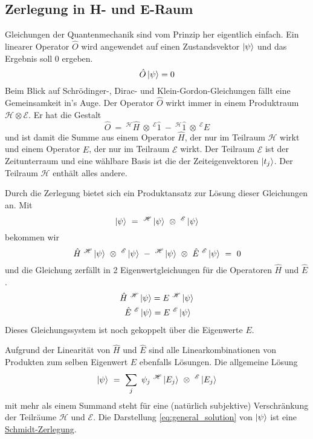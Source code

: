 \documentclass[12pt]{article}
\begin{document}
\subsection{Zerlegung in H- und E-Raum}
Gleichungen der Quantenmechanik sind vom Prinzip her eigentlich einfach. Ein linearer Operator $\hat{O}$ wird angewendet auf einen Zustandsvektor $\ket{\psi}$ und das Ergebnis soll $0$ ergeben.
\begin{equation*} 
\hat{O}\ket{\psi} = 0 
\end{equation*}
Beim Blick auf Schrödinger-, Dirac- und Klein-Gordon-Gleichungen fällt eine Gemeinsamkeit in's Auge. Der Operator $\hat{O}$ wirkt immer in einem Produktraum $\mathscr{H} \otimes \mathscr{E}$. Er hat die Gestalt 
\begin{equation*} 
\hat{O}\ =\ ^\mathscr{H}\hat{H}\ \otimes\ ^\mathscr{E}\hat{1}\ -\ ^\mathscr{H}\hat{1}\ \otimes\ ^\mathscr{E}\hat{E}
\end{equation*}
und ist damit die Summe aus einem Operator $\hat{H}$, der nur im Teilraum $\mathscr{H}$ wirkt und einem Operator $\hat{E}$, der nur im Teilraum $\mathscr{E}$ wirkt. Der Teilraum $\mathscr{E}$ ist der Zeitunterraum und eine wählbare Basis ist die der Zeiteigenvektoren $\ket{t_j}$. Der Teilraum $\mathscr{H}$ enthält alles andere.

Durch die Zerlegung bietet sich ein Produktansatz zur Lösung dieser Gleichungen an. Mit
\begin{equation*} 
\ket{\psi}\ =\ ^\mathscr{H}\ket{\psi}\ \otimes\ ^\mathscr{E}\ket{\psi}
\end{equation*}
bekommen wir
\begin{equation} 
\label{eq:productspace}
\hat{H}\ ^\mathscr{H}\ket{\psi}\ \otimes\ ^\mathscr{E}\ket{\psi}
\ - \ 
^\mathscr{H}\ket{\psi}\ \otimes\ \hat{E}\ ^\mathscr{E}\ket{\psi} \ =\ 0
\end{equation}
und die Gleichung zerfällt in 2 Eigenwertgleichungen für die Operatoren $\hat{H}$ und $\hat{E}$.
\begin{equation}
\label{eq:system}
\begin{split}
\hat{H}\ ^\mathscr{H}\ket{\psi} = E\ ^\mathscr{H}\ket{\psi}\\
\hat{E}\ ^\mathscr{E}\ket{\psi} = E\ ^\mathscr{E}\ket{\psi}\ 
\end{split}
\end{equation}
Dieses Gleichungssystem ist noch gekoppelt über die Eigenwerte $E$. 

Aufgrund der Linearität von $\hat{H}$ und $\hat{E}$ sind alle Linearkombinationen von Produkten zum selben Eigenwert $E$ ebenfalls Lösungen. Die allgemeine Lösung
\begin{equation}
\label{eq:general_solution}
\ket{\psi}\ =\ \sum_j\ \psi_j\ ^\mathscr{H}\ket{E_j}\ \otimes\ ^\mathscr{E}\ket{E_j}
\end{equation}
mit mehr als einem Summand steht für eine (natürlich subjektive) Verschränkung der Teilräume $\mathscr{H}$ und $\mathscr{E}$. Die Darstellung \eqref{eq:general_solution} von $\ket{\psi}$ ist eine \href{https://en.wikipedia.org/wiki/Schmidt_decomposition}{Schmidt-Zerlegung}.
\end{document}
